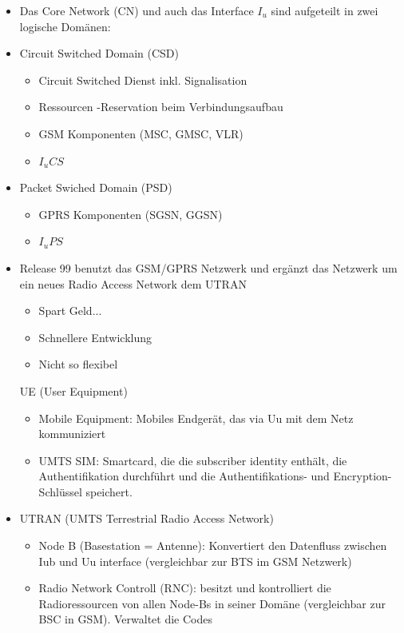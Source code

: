 \begin{minipage}{0.5\linewidth}
\begin{itemize}
\item Das Core Network (CN) und auch das Interface $I_u$ sind aufgeteilt in zwei logische Domänen:
\item Circuit Switched Domain (CSD)
\begin{itemize}
\item Circuit Switched Dienst inkl. Signalisation
\item Ressourcen -Reservation beim Verbindungsaufbau
\item GSM Komponenten (MSC, GMSC, VLR)
\item $I_uCS$
\end{itemize}
\item Packet Swiched Domain (PSD)
\begin{itemize}
\item GPRS Komponenten (SGSN, GGSN)
\item $I_uPS$
\end{itemize}
\item Release 99 benutzt das GSM/GPRS Netzwerk und ergänzt das Netzwerk um ein neues Radio Access Network dem UTRAN
\begin{itemize}
\item Spart Geld...
\item Schnellere Entwicklung
\item Nicht so flexibel 
\end{itemize}
UE (User Equipment)
\begin{itemize}
\item Mobile Equipment: Mobiles Endgerät, das via Uu mit dem Netz kommuniziert
\item UMTS SIM: Smartcard, die die subscriber identity enthält, die Authentifikation durchführt und die Authentifikations- und Encryption-Schlüssel speichert.
\end{itemize}
\item UTRAN (UMTS Terrestrial Radio Access Network)
\begin{itemize}
\item Node B (Basestation = Antenne): Konvertiert den Datenfluss zwischen Iub und Uu interface (vergleichbar zur BTS im GSM Netzwerk)
\item Radio Network Controll (RNC): besitzt und kontrolliert die Radioressourcen von allen Node-Bs in seiner Domäne (vergleichbar zur BSC in GSM). Verwaltet die Codes
\end{itemize}
\end{itemize}
\end{minipage}


